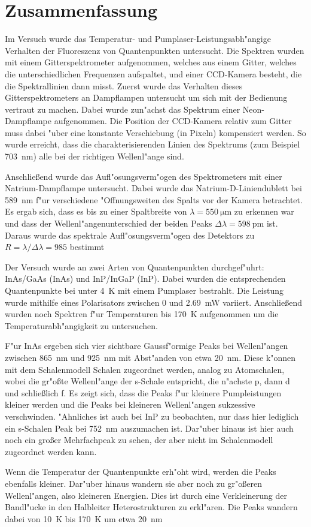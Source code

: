 \section{Zusammenfassung}
Im Versuch wurde das Temperatur- und Pumplaser-Leistungsabh"angige Verhalten der Fluoreszenz von Quantenpunkten untersucht.
Die Spektren wurden mit einem Gitterspektrometer aufgenommen, welches aus einem Gitter, welches die unterschiedlichen Frequenzen aufspaltet, und einer CCD-Kamera besteht, die die Spektrallinien dann misst.
Zuerst wurde das Verhalten dieses Gitterspektrometers an Dampflampen untersucht um sich mit der Bedienung vertraut zu machen.
Dabei wurde zun"achst das Spektrum einer Neon-Dampflampe aufgenommen.
Die Position der CCD-Kamera relativ zum Gitter muss dabei "uber eine konstante Verschiebung (in Pixeln) kompensiert werden.
So wurde erreicht, dass die charakterisierenden Linien des Spektrums (zum Beispiel \SI{703}{nm}) alle bei der richtigen Wellenl"ange sind.

Anschlie\ss end wurde das Aufl"osungsverm"ogen des Spektrometers mit einer Natrium-Dampflampe untersucht.
Dabei wurde das Natrium-D-Liniendublett bei \SI{589}{nm} f"ur verschiedene "Offnungsweiten des Spalts vor der Kamera betrachtet.
Es ergab sich, dass es bis zu einer Spaltbreite von $\lambda=\SI{550}{\micro\metre}$ zu erkennen war und dass der Wellenl"angenunterschied der beiden Peaks $\Delta\lambda=\SI{598}{\pico\metre}$ ist.
Daraus wurde das spektrale Aufl"osungsverm"ogen des Detektors zu $R=\lambda/\Delta\lambda =985$ bestimmt

Der Versuch wurde an zwei Arten von Quantenpunkten durchgef"uhrt: InAs/GaAs (InAs) und InP/InGaP (InP).
Dabei wurden die entsprechenden Quantenpunkte bei unter \SI{4}{\kelvin} mit einem Pumplaser bestrahlt.
Die Leistung wurde mithilfe eines Polarisators zwischen 0 und \SI{2.69}{\milli\watt} variiert.
Anschlie\ss end wurden noch Spektren f"ur Temperaturen bis \SI{170}{\kelvin} aufgenommen um die Temperaturabh"angigkeit zu untersuchen.

F"ur InAs ergeben sich vier sichtbare Gaussf"ormige Peaks bei Wellenl"angen zwischen \SI{865}{nm} und \SI{925}{nm} mit Abst"anden von etwa \SI{20}{nm}.
Diese k"onnen mit dem Schalenmodell Schalen zugeordnet werden, analog zu Atomschalen, wobei die gr"o{\ss}te Wellenl"ange der s-Schale entspricht, die n"achste p, dann d und schlie{\ss}lich f.
Es zeigt sich, dass die Peaks f"ur kleinere Pumpleistungen kleiner werden und die Peaks bei kleineren Wellenl"angen sukzessive verschwinden.
"Ahnliches ist auch bei InP zu beobachten, nur dass hier lediglich ein s-Schalen Peak bei \SI{752}{nm} auszumachen ist.
Dar"uber hinaus ist hier auch noch ein gro{\ss}er Mehrfachpeak zu sehen, der aber nicht im Schalenmodell zugeordnet werden kann.

Wenn die Temperatur der Quantenpunkte erh"oht wird, werden die Peaks ebenfalls kleiner.
Dar"uber hinaus wandern sie aber noch zu gr"o{\ss}eren Wellenl"angen, also kleineren Energien.
Dies ist durch eine Verkleinerung der Bandl"ucke in den Halbleiter Heterostrukturen zu erkl"aren.
Die Peaks wandern dabei von \SI{10}{\kelvin} bis \SI{170}{\kelvin} um etwa \SI{20}{\nano\metre}
